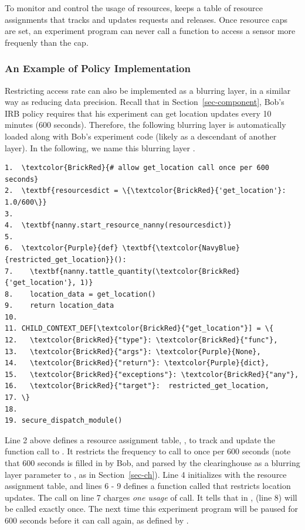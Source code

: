To monitor and control the usage of resources,  keeps a 
table of resource assignments that tracks and updates requests and releases. 
Once resource caps are set, an experiment program can never call a 
function to access a sensor more frequenly than the cap. 

\subsubsection{An Example of Policy Implementation}\label{sec-rate-example}

Restricting access rate can also be implemented as a 
blurring layer, in a similar way as reducing data precision.
Recall that in Section~\ref{sec-component}, Bob's IRB policy requires that
his experiment can get location updates every 10 minutes (600 seconds). 
Therefore, the following blurring layer is automatically loaded along with 
Bob's experiment code (likely as a descendant of another layer). In 
the following, we name this blurring layer .

\begin{Verbatim}
1.  \textcolor{BrickRed}{# allow get_location call once per 600 seconds}
2.  \textbf{resourcesdict = \{\textcolor{BrickRed}{'get_location'}: 1.0/600\}} 
3.
4.  \textbf{nanny.start_resource_nanny(resourcesdict)}
5.
6.  \textcolor{Purple}{def} \textbf{\textcolor{NavyBlue}{restricted_get_location}}():
7.    \textbf{nanny.tattle_quantity(\textcolor{BrickRed}{'get_location'}, 1)}
8.    location_data = get_location()
9.    return location_data
10.
11. CHILD_CONTEXT_DEF[\textcolor{BrickRed}{"get_location"}] = \{
12.   \textcolor{BrickRed}{"type"}: \textcolor{BrickRed}{"func"},
13.   \textcolor{BrickRed}{"args"}: \textcolor{Purple}{None},
14.   \textcolor{BrickRed}{"return"}: \textcolor{Purple}{dict},
15.   \textcolor{BrickRed}{"exceptions"}: \textcolor{BrickRed}{"any"},
16.   \textcolor{BrickRed}{"target"}:  restricted_get_location,
17. \}
18. 
19. secure_dispatch_module()
\end{Verbatim}

Line 2 above defines a resource assignment table, , to track and update 
the function call to . It restricts the frequency to 
call  to once per 600 seconds (note that 
600 seconds is filled in by Bob, and parsed by the clearinghouse as a blurring layer 
parameter to , as in Section~\ref{sec-ch}). Line 4 initializes  
with the resource assignment table, and lines 6 - 9 defines a 
function called  that restricts location updates. 
The  call on line 7 charges \textit{one usage} of  
call. It tells  that in , 
 (line 8) will be called exactly once. The
next time this experiment program 
will be paused for 600 seconds before it can call  again,
as defined by .

